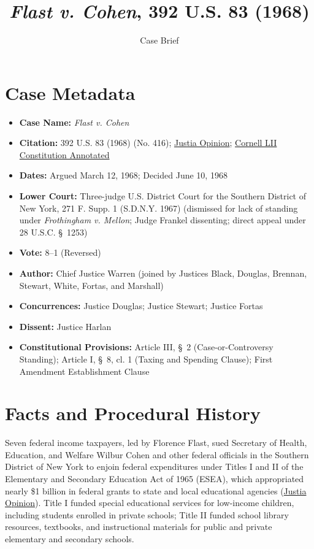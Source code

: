 \documentclass[12pt]{article}
\title{\textit{Flast v. Cohen}, 392 U.S. 83 (1968)}
\author{Case Brief}
\date{}
\begin{document}
\maketitle

\section{Case Metadata}
\begin{itemize}
  \item \textbf{Case Name:} \textit{Flast v. Cohen}
  \item \textbf{Citation:} 392 U.S. 83 (1968) (No. 416); \href{https://supreme.justia.com/cases/federal/us/392/83/}{Justia Opinion}; \href{https://www.law.cornell.edu/constitution-conan/article-3/section-2/clause-1/taxpayer-standing}{Cornell LII Constitution Annotated}
  \item \textbf{Dates:} Argued March 12, 1968; Decided June 10, 1968
  \item \textbf{Lower Court:} Three-judge U.S. District Court for the Southern District of New York, 271 F. Supp. 1 (S.D.N.Y. 1967) (dismissed for lack of standing under \textit{Frothingham v. Mellon}; Judge Frankel dissenting; direct appeal under 28 U.S.C. \S\ 1253)
  \item \textbf{Vote:} 8--1 (Reversed)
  \item \textbf{Author:} Chief Justice Warren (joined by Justices Black, Douglas, Brennan, Stewart, White, Fortas, and Marshall)
  \item \textbf{Concurrences:} Justice Douglas; Justice Stewart; Justice Fortas
  \item \textbf{Dissent:} Justice Harlan
  \item \textbf{Constitutional Provisions:} Article III, \S\ 2 (Case-or-Controversy Standing); Article I, \S\ 8, cl. 1 (Taxing and Spending Clause); First Amendment Establishment Clause
\end{itemize}

\section{Facts and Procedural History}
Seven federal income taxpayers, led by Florence Flast, sued Secretary of Health, Education, and Welfare Wilbur Cohen and other federal officials in the Southern District of New York to enjoin federal expenditures under Titles I and II of the Elementary and Secondary Education Act of 1965 (ESEA), which appropriated nearly \$1 billion in federal grants to state and local educational agencies (\href{https://supreme.justia.com/cases/federal/us/392/83/}{Justia Opinion}). Title I funded special educational services for low-income children, including students enrolled in private schools; Title II funded school library resources, textbooks, and instructional materials for public and private elementary and secondary schools.
\end{document}
